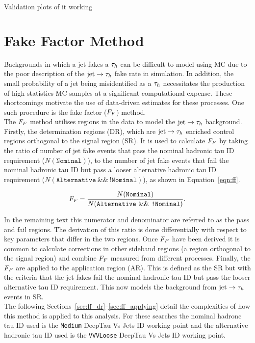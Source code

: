 Validation plots of it working

\section{Fake Factor Method}
\label{sec:ff}

Backgrounds in which a jet fakes a $\tau_{h}$ can be difficult to model using MC due to the poor description of the $\text{jet}\rightarrow\tau_{h}$ fake rate in simulation. 
In addition, the small probability of a jet being misidentified as a $\tau_{h}$ necessitates the production of high statistics MC samples at a significant computational expense.
These shortcomings motivate the use of data-driven estimates for these processes. 
One such procedure is the fake factor ($F_{F}$) method. \\

The $F_{F}$ method utilises regions in the data to model the $\text{jet}\rightarrow\tau_{h}$ background. 
Firstly, the determination regions (DR), which are $\text{jet}\rightarrow\tau_{h}$ enriched control regions orthogonal to the signal region (SR). 
It is used to calculate $F_{F}$ by taking the ratio of number of jet fake events that pass the nominal hadronic tau ID requirement ($N(\texttt{Nominal})$), to the number of jet fake events that fail the nominal hadronic tau ID but pass a looser alternative hadronic tau ID requirement ($N(\texttt{Alternative}~\&\&~\texttt{!Nominal})$), as shown in Equation~\ref{eqn:ff}.

\begin{equation}
F_{F} = \frac{N(\texttt{Nominal})}{N(\texttt{Alternative}~\&\&~\texttt{!Nominal})}.
\label{eqn:ff}
\end{equation}

In the remaining text this numerator and denominator are referred to as the pass and fail regions.
The derivation of this ratio is done differentially with respect to key parameters that differ in the two regions.
Once $F_{F}$ have been derived it is common to calculate corrections in other sideband regions (a region orthogonal to the signal region) and combine $F_{F}$ measured from different processes.
Finally, the $F_{F}$ are applied to the application region (AR). 
This is defined as the SR but with the criteria that the jet fakes fail the nominal hadronic tau ID but pass the looser alternative tau ID requirement.
This now models the background from $\text{jet}\rightarrow\tau_{h}$ events in SR. \\

The following Sections~\ref{sec:ff_dr}--\ref{sec:ff_applying} detail the complexities of how this method is applied to this analysis.
For these searches the nominal hadronc tau ID used is the \texttt{Medium} DeepTau Vs Jets ID working point and the alternative hadronic tau ID used is the \texttt{VVVLoose} DeepTau Vs Jets ID working point.

